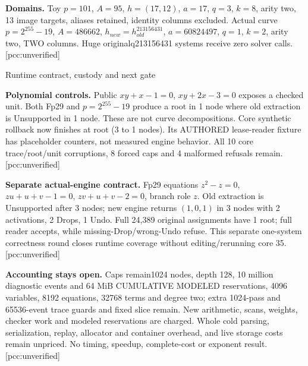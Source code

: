 \documentclass[10pt]{article}
\begin{document}
\textbf{Domains.} Toy $p=101$, $A=95$, $h=(17,12)$, $a=17$, $q=3$, $k=8$, arity two, 13 image targets,
aliases retained, identity columns excluded. Actual curve $p=2^{255}-19$,
$A=486662$, $h_{new}=h_{old}^{213156431}$, $a=60824497$, $q=1$, $k=2$, arity two, TWO columns.
Huge originalq213156431 systems receive zero solver calls. [pcc:unverified]

\newpage
\begin{center}\Large Runtime contract, custody and next gate\end{center}
\textbf{Polynomial controls.} Public $xy+x-1=0$, $xy+2x-3=0$ exposes a
checked unit. Both Fp29 and $p=2^{255}-19$ produce a root in 1 node where old
extraction is Unsupported in 1 node. These are not curve decompositions.
Core synthetic rollback now finishes at root (3 to 1 nodes). Its AUTHORED
lease-reader fixture has placeholder counters, not measured engine behavior.
All 10 core trace/root/unit corruptions, 8 forced caps and 4 malformed refusals
remain. [pcc:unverified]

\textbf{Separate actual-engine contract.} Fp29 equations $z^2-z=0$,
$zu+u+v-1=0$, $zv+u+v-2=0$, branch role $z$. Old extraction is Unsupported
after 3 nodes; new engine returns $(1,0,1)$ in 3 nodes with 2 activations, 2 Drops,
1 Undo. Full 24,389 original assignments have 1 root; full reader accepts, while
missing-Drop/wrong-Undo refuse. This separate one-system correctness round
closes runtime coverage without editing/rerunning core 35. [pcc:unverified]

\textbf{Accounting stays open.} Caps remain1024 nodes, depth 128, 10 million
diagnostic events and 64 MiB CUMULATIVE MODELED reservations, 4096 variables,
8192 equations, 32768 terms and degree two; extra 1024-pass and 65536-event trace guards and fixed slice remain.
New arithmetic, scans, weights, checker work and modeled reservations are charged. Whole
cold parsing, serialization, replay, allocator and container overhead, and live storage costs remain
unpriced. No timing, speedup, complete-cost or exponent result. [pcc:unverified]
\end{document}
